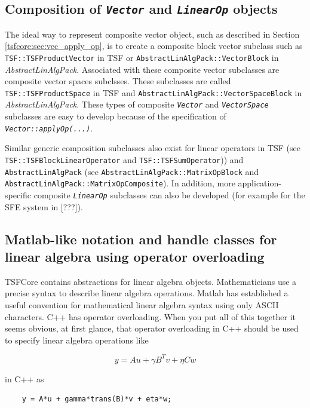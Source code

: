 \documentclass[10pt,fleqn]{article}
\begin{document}
%
\subsection{Composition of \texttt{\textit{Vector}} and \texttt{\textit{LinearOp}} objects}
%

The ideal way to represent composite vector object, such as described
in Section \ref{tsfcore:sec:vec_apply_op}, is to create a composite block
vector subclass such as \texttt{TSF::TSFProductVector} in TSF or
\texttt{AbstractLinAlgPack\-::VectorBlock} in
\textit{AbstractLinAlgPack}.  Associated with these composite vector
subclasses are composite vector spaces subclsses.  These subclasses
are called \texttt{TSF\-::TSFProductSpace} in TSF and
\texttt{AbstractLinAlgPack\-::VectorSpaceBlock} in
\textit{AbstractLinAlgPack}.  These types of composite
\texttt{\textit{Vector}} and \texttt{\textit{VectorSpace}} subclasses
are easy to develop because of the specification of
\texttt{\textit{Vector\-::applyOp(...)}}.

Similar generic composition subclasses also exist for linear operators
in TSF (see \texttt{TSF::TSFBlockLinearOperator} and
\texttt{TSF::TSFSumOperator})) and \texttt{AbstractLinAlgPack} (see
\texttt{AbstractLinAlgPack\-::MatrixOpBlock} and
\texttt{AbstractLinAlgPack\-::MatrixOpComposite}).  In addition, more
application-specific composite \texttt{\textit{LinearOp}} subclasses
can also be developed (for example for the SFE system in [???]).

%
\subsection{Matlab-like notation and handle classes for linear algebra using operator overloading}
\label{tsfcore:sec:operator_overloading}
%

TSFCore contains abstractions for linear algebra objects.  Mathematicians
use a precise syntax to describe linear algebra operations.  Matlab
\cite{ref:matlab} has established a useful convention for mathematical
linear algebra syntax using only ASCII characters.  C++ has operator
overloading.  When you put all of this together it seems obvious, at
first glance, that operator overloading in C++ should be used to
specify linear algebra operations like

\[
y = A u + \gamma B^T v + \eta C w
\]

in C++ as

\begin{verbatim}
    y = A*u + gamma*trans(B)*v + eta*w;
\end{verbatim}
\end{document}
